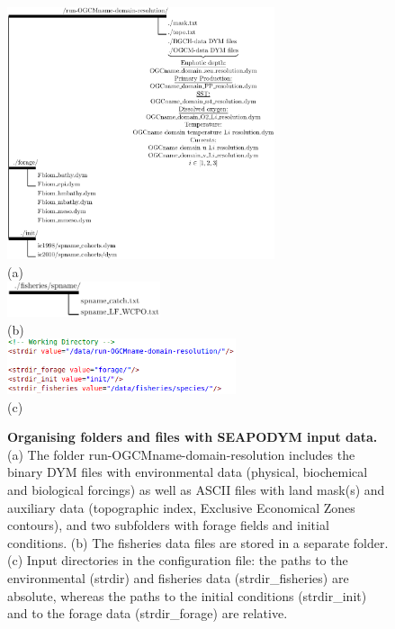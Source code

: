  \begin{figure}[H]
   \centering
    \vbox{
    \includegraphics[width=0.7\textwidth]{chapter3/figs/arborescence_run.pdf}\\
    (a)\\
    \vspace{5mm}
    \includegraphics[width=0.4\textwidth]{chapter3/figs/arborescence_fisheries.pdf} \\
   (b) \\
    \vspace{5mm}
   \includegraphics[width=0.6\textwidth]{chapter3/figs/working_input_directory.png} \\
   (c) \\
   }
   \caption{{\bfseries Organising folders and files with SEAPODYM input data.}
   (a) The folder {\ttfamily run-OGCMname-domain-resolution} includes the binary DYM files with environmental data (physical, biochemical and biological forcings) as well as ASCII files with land mask(s) and auxiliary data (topographic index, Exclusive Economical Zones contours), and two subfolders with forage fields and initial conditions. (b) The fisheries data files are stored in a separate folder. (c) Input directories in the configuration file: the paths to the environmental (\textcolor{BrickRed}{{\ttfamily strdir}}) and fisheries data (\textcolor{BrickRed}{{\ttfamily strdir\_fisheries}}) are absolute, whereas the paths to the initial conditions (\textcolor{BrickRed}{{\ttfamily strdir\_init}}) and to the forage data (\textcolor{BrickRed}{{\ttfamily strdir\_forage}}) are relative. }
   \label{fig:arborescence_run}
 \end{figure}

